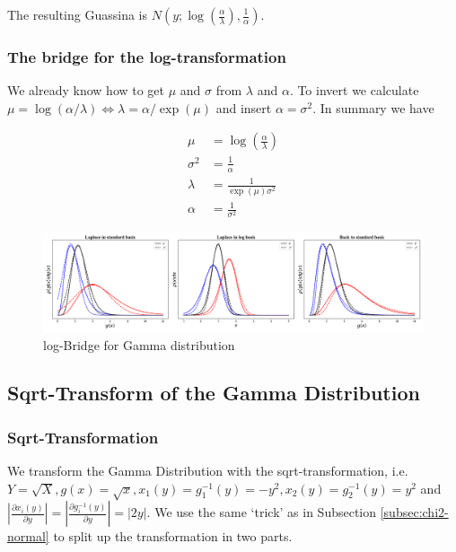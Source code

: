 The resulting Guassina is $N(y; \log\left(\frac{\alpha}{\lambda}\right), \frac{1}{\alpha})$.

\subsubsection{The bridge for the log-transformation}

We already know how to get $\mu$ and $\sigma$ from $\lambda$ and $\alpha$. To invert we calculate $\mu = \log(\alpha/\lambda) \Leftrightarrow \lambda= \alpha/\exp(\mu)$ and insert $\alpha=\sigma^2$. In summary we have

\begin{subequations}
\begin{align}
\mu &= \log\left(\frac{\alpha}{\lambda}\right) \\
\sigma^2 &= \frac{1}{\alpha} \\
\lambda &=  \frac{1}{\exp(\mu)\sigma^2}\\
\alpha &= \frac{1}{\sigma^2}
\end{align}
\end{subequations}

\begin{figure}[!htb]
	\centering
	\includegraphics[width=\textwidth]{figures/Gamma_log_bridge.pdf}
	\caption{log-Bridge for Gamma distribution}
	\label{fig:gamma_log_bridge}
\end{figure}

\subsection{Sqrt-Transform of the Gamma Distribution}

\subsubsection{Sqrt-Transformation}

We transform the Gamma Distribution with the sqrt-transformation, i.e. $Y = \sqrt{X}, g(x) = \sqrt{x},x_1(y) =  g_1^{-1}(y) = -y^2, x_2(y) = g_2^{-1}(y) = y^2$ and $\left\vert\frac{\partial x_i(y)}{\partial y} \right\vert = \left\vert\frac{\partial g_i^{-1}(y)}{\partial y} \right\vert = \vert 2y \vert$. We use the same `trick' as in Subsection \ref{subsec:chi2-normal} to split up the transformation in two parts. 


